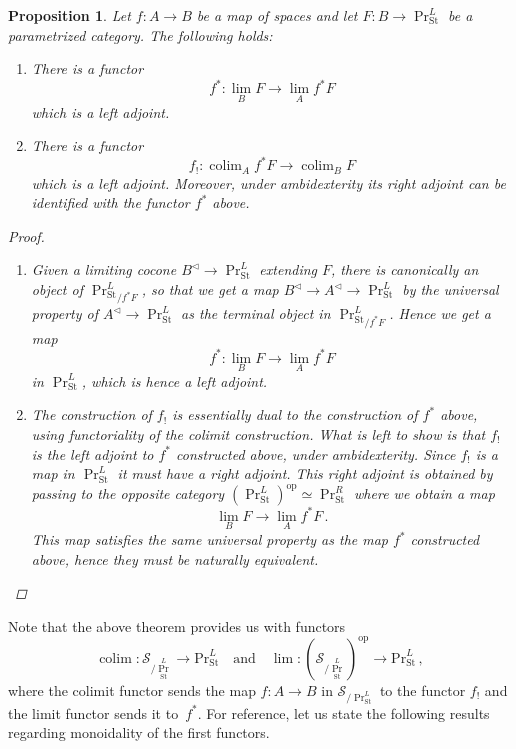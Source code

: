 \documentclass[10pt]{amsart}
\newcommand{\longto}{\longrightarrow}
\theoremstyle{plain}
\newtheorem{proposition}[theorem]{Proposition}
\theoremstyle{definition}
\DeclareMathOperator*{\colim}{colim}
\newcommand{\St}{\mathrm{St}}
\newcommand{\oop}{\mathrm{op}}
\newcommand{\cS}{\mathcal{S}}
\newcommand{\och}{\quad \text{and} \quad}
\begin{document}
\begin{proposition} \label{prop:left_right_adjoints_ambidexterity}
    Let $f : A \to B $ be a map of spaces and let $F:   B \to \Pr^{L}_{\St}$ be a parametrized category. The following holds:
    \begin{enumerate}
      \item There is a functor
      \[
      f^*: \lim_{B}F \longto \lim_{A}f^* F
      \]
      which is a left adjoint.
      \item There is a functor
      \[
      f_!: \colim_{A} f^* F \longto \colim_{B} F
      \]
      which is a left adjoint.
      Moreover, under ambidexterity its right adjoint can be identified with the functor $f^*$ above.
    \end{enumerate}
    \begin{proof}
      \leavevmode
      \begin{enumerate}
        \item Given a limiting cocone $B^{\triangleleft} \to \Pr^{L}_{\St}$ extending $F$, there is canonically an object of ${\Pr^{L}_{\St}}_{/f^* F}$, so that we get a map $B^{\triangleleft} \to A^{\triangleleft} \to \Pr^{L}_{\St}$ by the universal property of $A^{\triangleleft} \to \Pr^{L}_{\St}$ as the terminal object in ${\Pr^{L}_{\St}}_{/f^* F}$.
        Hence we get a map
        \[
        f^* : \lim_B F \longto \lim_A f^* F
        \]
        in $\Pr^{L}_{\St}$, which is hence a left adjoint.
        \item The construction of $f_!$ is essentially dual to the construction of $f^*$ above, using functoriality of the colimit construction. What is left to show is that $f_!$ is the left adjoint to $f^*$ constructed above, under ambidexterity. Since $f_!$ is a map in $\Pr^{L}_{\St}$ it must have a right adjoint. This right adjoint is obtained by passing to the opposite category $(\Pr^{L}_{\St})^{\oop} \simeq \Pr^{R}_{\St}$ where we obtain a map
        \[
        \lim_B F \longto \lim_A f^* F \,.
        \]
        This map satisfies the same universal property as the map $f^*$ constructed above, hence they must be naturally equivalent.
      \end{enumerate}
    \end{proof}
\end{proposition}

Note that the above theorem provides us with functors
\[
\colim : \cS_{/\Pr^{L}_{\St}} \longto \mathrm{Pr}^{L}_{\St} \och \lim : (\cS_{/\Pr^{L}_{\St}})^{\oop} \longto \mathrm{Pr}^{L}_{\St} \,,
\]
where the colimit functor sends the map $f : A \to B$ in $\cS_{/\Pr^{L}_{\St}}$ to the functor $f_!$ and the limit functor sends it to~$f^*$.
For reference, let us state the following results regarding monoidality of the first functors.
\end{document}
